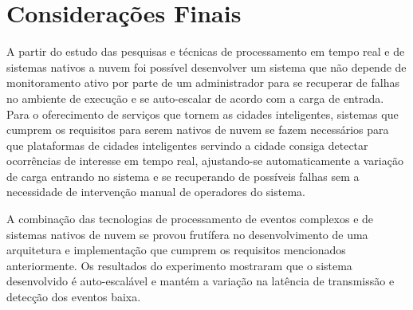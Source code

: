 







\section{Considerações Finais} 

A partir do estudo das pesquisas e técnicas de processamento em tempo real e de sistemas nativos a nuvem foi possível desenvolver um sistema que não depende de monitoramento ativo por parte de um administrador para se recuperar de falhas no ambiente de execução e se auto-escalar de acordo com a carga de entrada. Para o oferecimento de serviços que tornem as cidades inteligentes, sistemas que cumprem os requisitos para serem nativos de nuvem se fazem necessários para que plataformas de cidades inteligentes servindo a cidade consiga detectar ocorrências de interesse em tempo real, ajustando-se automaticamente a variação de carga entrando no sistema e se recuperando de possíveis falhas sem a necessidade de intervenção manual de operadores do sistema.



A combinação das tecnologias de processamento de eventos complexos e de sistemas nativos de nuvem se provou frutífera no desenvolvimento de uma arquitetura e implementação que cumprem os requisitos mencionados anteriormente. 
Os resultados do experimento mostraram que o sistema desenvolvido é auto-escalável e mantém a variação na latência de transmissão e detecção dos eventos baixa.

